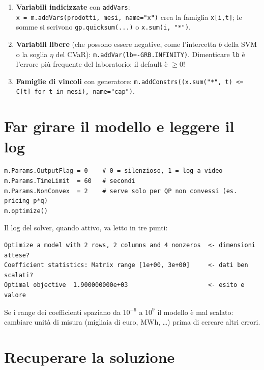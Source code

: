 \begin{spiegazione}
\begin{enumerate}
  \item \textbf{Variabili indicizzate} con \texttt{addVars}: \\
        \texttt{x = m.addVars(prodotti, mesi, name="x")} crea la famiglia
        \texttt{x[i,t]}; le somme si scrivono \texttt{gp.quicksum(...)} o
        \texttt{x.sum(i, "*")}.
  \item \textbf{Variabili libere} (che possono essere negative, come l'intercetta $b$
        della SVM o la soglia $\eta$ del CVaR): \texttt{m.addVar(lb=-GRB.INFINITY)}.
        Dimenticare \texttt{lb} è l'errore più frequente del laboratorio: il default
        è $\ge 0$!
  \item \textbf{Famiglie di vincoli} con generatore:
        \texttt{m.addConstrs((x.sum("*", t) <= C[t] for t in mesi), name="cap")}.
\end{enumerate}
\end{spiegazione}

\section{Far girare il modello e leggere il log}

\begin{lstlisting}[style=python]
m.Params.OutputFlag = 0    # 0 = silenzioso, 1 = log a video
m.Params.TimeLimit  = 60   # secondi
m.Params.NonConvex  = 2    # serve solo per QP non convessi (es. pricing p*q)
m.optimize()
\end{lstlisting}

Il log del solver, quando attivo, va letto in tre punti:

\begin{lstlisting}[style=output]
Optimize a model with 2 rows, 2 columns and 4 nonzeros  <- dimensioni attese?
Coefficient statistics: Matrix range [1e+00, 3e+00]     <- dati ben scalati?
Optimal objective  1.900000000e+03                      <- esito e valore
\end{lstlisting}

Se i range dei coefficienti spaziano da $10^{-6}$ a $10^{9}$ il modello è mal scalato:
cambiare unità di misura (migliaia di euro, MWh, \dots) prima di cercare altri errori.

\section{Recuperare la soluzione}

